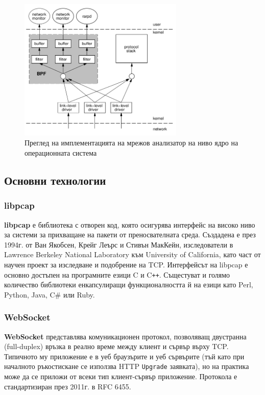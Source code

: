 \documentclass[12pt,a4paper,oneside]{book}
\begin{document}
\begin{figure}[h!]
  \centering
  \includegraphics[width=0.7\textwidth]{figures/bpf_overview.png}
  \caption{Преглед на имплементацията на мрежов анализатор на ниво ядро на
  операционната система}
  \label{bpf_overview_fig}
\end{figure}

\subsection{Основни технологии}

\subsubsection{libpcap}

\textbf{libpcap} е библиотека с отворен код, която осигурява интерфейс на високо
ниво за системи за прихващане на пакети от преносвателната среда. Създадена е
през 1994г. от Ван Якобсен, Крейг Леърс и Стивън МакКейн, изследователи в
Lawrence Berkeley National Laboratory към University of California,
като част от научен проект за изследване и подобрение на TCP. Интерфейсът на
libpcap е основно достъпен на програмните езици C и C\texttt{++}.
Същестуват и голямо количество библиотеки
енкапсулиращи функционалността й на езици като Perl, Python, Java, C# или Ruby.

\subsubsection{WebSocket}

\textbf{WebSocket} представлява комуникационен протокол, позволяващ двустранна
(full-duplex) връзка в реално време между клиент и сървър върху TCP. Типичното му
приложение е в уеб браузърите и уеб сървърите (тъй като при началното ръкостискане се използва
HTTP \texttt{Upgrade} заявката), но на практика може да се приложи от всеки тип
клиент-сървър приложение. Протокола е стандартизиран през 2011г. в RFC 6455.
\end{document}
